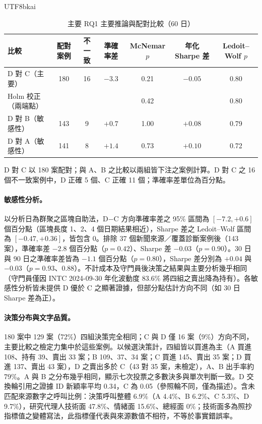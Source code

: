 \documentclass[12pt,a4paper]{article}
\newcommand{\grp}[1]{\textsf{#1}}
\begin{document}
\begin{CJK}{UTF8}{bkai}
\begin{table}[H]
\centering\footnotesize
\caption{主要 RQ1 主要推論與配對比較（60 日）}
\label{tab:formaltests}
\begin{tabular}{@{}lcccccc@{}}
\toprule
比較 & 配對案例 & 不一致 & 準確率差 & McNemar $p$ & 年化 Sharpe 差 & Ledoit--Wolf $p$ \\
\midrule
\grp{D} 對 \grp{C}（主要） & 180 & 16 & $-3.3$ & 0.21 & $-0.05$ & 0.80 \\
\quad Holm 校正（兩端點） & & & & 0.42 & & 0.80 \\
\grp{D} 對 \grp{B}（敏感性） & 143 & 9 & $+0.7$ & 1.00 & $+0.08$ & 0.79 \\
\grp{D} 對 \grp{A}（敏感性） & 141 & 8 & $+1.4$ & 0.73 & $+0.10$ & 0.72 \\
\bottomrule
\end{tabular}
\par\smallskip
\raggedright\footnotesize \grp{D} 對 \grp{C} 以 180 案配對；與 \grp{A}、\grp{B} 之比較以兩組皆下注之案例計算。\grp{D} 對 \grp{C} 之 16 個不一致案例中，\grp{D} 正確 5 個、\grp{C} 正確 11 個；準確率差單位為百分點。
\end{table}

\paragraph{敏感性分析。} 以分析日為群聚之區塊自助法，\grp{D}$-$\grp{C} 方向準確率差之 95\% 區間為 $[-7.2, +0.6]$ 個百分點（區塊長度 1、2、4 個日期結果相近），Sharpe 差之 Ledoit--Wolf 區間為 $[-0.47, +0.36]$，皆包含 0。排除 37 個新聞來源／覆蓋診斷案例後（143 案），準確率差 $-2.8$ 個百分點（$p=0.42$）、Sharpe 差 $-0.03$（$p=0.90$）。30 日與 90 日之準確率差皆為 $-1.1$ 個百分點（$p=0.80$），Sharpe 差分別為 $+0.04$ 與 $-0.03$（$p=0.93$、$0.88$）。不計成本及守門員後決策之結果與主要分析幾乎相同（守門員僅因 INTC 2024-09-30 年化波動度 83.6\% 將四組之賣出降為持有）。各敏感性分析皆未提供 \grp{D} 優於 \grp{C} 之顯著證據，但部分點估計方向不同（如 30 日 Sharpe 差為正）。

\paragraph{決策分布與文字品質。} 180 案中 129 案（72\%）四組決策完全相同；\grp{C} 與 \grp{D} 僅 16 案（9\%）方向不同，主要比較之檢定力集中於這些案例。以候選決策計，四組皆以買進為主（\grp{A} 買進 108、持有 39、賣出 33 案；\grp{B} 109、37、34 案；\grp{C} 買進 145、賣出 35 案；\grp{D} 買進 137、賣出 43 案），\grp{D} 之賣出多於 \grp{C}（43 對 35 案，未檢定），\grp{A}、\grp{B} 出手率約 79\%。\grp{A} 與 \grp{B} 之分布幾乎相同，顯示七次投票之多數決多與單次判斷一致。\grp{D} 交換輪引用之證據 ID 新穎率平均 0.34，\grp{C} 為 0.05（參照輪不同，僅為描述）。含未匹配來源數字之呼叫比例：決策呼叫整體 6.9\%（\grp{A} 4.4\%、\grp{B} 6.2\%、\grp{C} 5.3\%、\grp{D} 9.7\%），研究代理人技術面 47.8\%、情緒面 15.6\%、總經面 0\%；技術面多為照抄指標值之變體寫法，此指標僅代表與來源數值不相符，不等於事實錯誤率。


\end{CJK}
\end{document}
